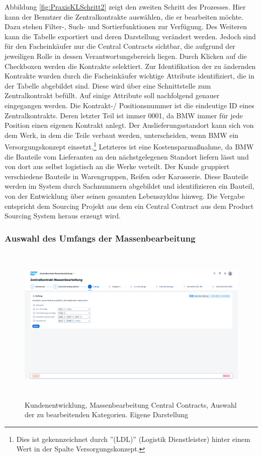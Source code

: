 Abbildung \ref{fig:PraxisKLSchritt2} zeigt den zweiten Schritt des Prozesses. Hier kann der Benutzer die Zentralkontrakte auswählen, die er bearbeiten möchte. Dazu stehen Filter-, Such- und Sortierfunktionen zur Verfügung. Des Weiteren kann die Tabelle exportiert und deren Darstellung verändert werden. Jedoch sind für den Facheinkäufer nur die Central Contracts sichtbar, die aufgrund der jeweiligen Rolle in dessen Verantwortungsbereich liegen. Durch Klicken auf die Checkboxen werden die Kontrakte selektiert. Zur Identifikation der zu ändernden Kontrakte wurden durch die Facheinkäufer wichtige Attribute identifiziert, die in der Tabelle abgebildet sind. Diese wird über eine Schnittstelle zum Zentralkontrakt befüllt. Auf einige Attribute soll nachfolgend genauer eingegangen werden. Die Kontrakt-/ Positionsnummer ist die eindeutige ID eines Zentralkontrakts. Deren letzter Teil ist immer 0001, da BMW immer für jede Position einen eigenen Kontrakt anlegt. Der Auslieferungsstandort kann sich von dem Werk, in dem die Teile verbaut werden, unterscheiden, wenn BMW ein Versorgungskonzept einsetzt.\footnote{Dies ist gekennzeichnet durch ''(LDL)'' (Logistik Dienstleister) hinter einem Wert in der Spalte Versorgungskonzept.} Letzteres ist eine Kostensparmaßnahme, da BMW die Bauteile vom Lieferanten an den nächstgelegenen Standort liefern lässt und von dort aus selbst logistisch an die Werke verteilt. Der Kunde gruppiert verschiedene Bauteile in Warengruppen, \zB Reifen oder Karosserie. Diese Bauteile werden im System durch Sachnummern abgebildet und identifizieren ein Bauteil, von der Entwicklung über seinen gesamten Lebenszyklus hinweg. Die Vergabe entspricht dem Sourcing Projekt aus dem ein Central Contract aus dem Product Sourcing System heraus erzeugt wird. 

\subsubsection{Auswahl des Umfangs der Massenbearbeitung}

\begin{figure}[H]
    \centering
    \includegraphics[height=7.65cm]{Bilder/Praxisteil-KL-Schritt-3.png}
    \caption[Kundenentwicklung, Massenbearbeitung Central Contracts, Auswahl der zu bearbeitenden Kategorien]{Kundenentwicklung, Massenbearbeitung Central Contracts, Auswahl der zu bearbeitenden Kategorien. Eigene Darstellung}
    \label{fig:PraxisKLSchritt3}
\end{figure}

